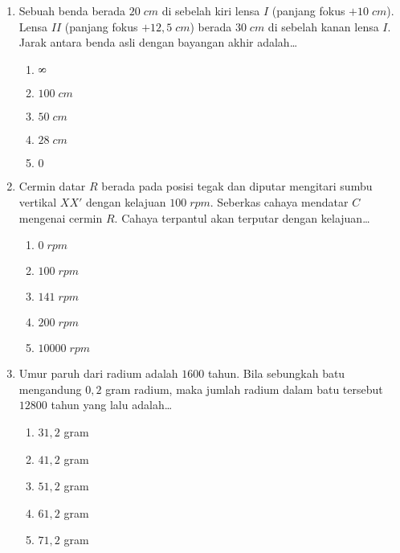 \documentclass[A4,12PT, english, twocolumn]{journal}
\def\infinity{\rotatebox{90}{8}}
\begin{document}
\begin{enumerate}
\item Sebuah benda berada $20 \; cm$ di sebelah kiri lensa $I$ (panjang fokus $+10 \; cm$). Lensa $II$ (panjang fokus $+12,5 \; cm$) berada $30 \; cm$ di sebelah kanan lensa $I$. Jarak antara benda asli dengan bayangan akhir adalah\dots
    \begin{enumerate}
        \item $\infinity$
        \item $100 \; cm$
        \item $50 \; cm$
        \item $28 \; cm$
        \item $0$
    \end{enumerate}

\item Cermin datar $R$ berada pada posisi tegak dan diputar mengitari sumbu vertikal $XX'$ dengan kelajuan $100 \; rpm$. Seberkas cahaya mendatar $C$ mengenai cermin $R$. Cahaya terpantul akan terputar dengan kelajuan\dots
\begin{center}
\end{center}
    \begin{enumerate}
        \item $0 \; rpm$
        \item $100 \; rpm$
        \item $141 \; rpm$
        \item $200 \; rpm$
        \item $10000 \; rpm$
    \end{enumerate}

\item Umur paruh dari radium adalah $1600$ tahun. Bila sebungkah batu mengandung $0,2$ gram radium, maka jumlah radium dalam batu tersebut $12800$ tahun yang lalu adalah\dots
    \begin{enumerate}
        \item $31,2$ gram
        \item $41,2$ gram
        \item $51,2$ gram
        \item $61,2$ gram
        \item $71,2$ gram
    \end{enumerate}


\end{enumerate}
\end{document}
